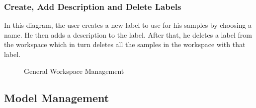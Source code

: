 \subsubsection{Create, Add Description and Delete Labels}
In this diagram, the user creates a new label to use for his samples by choosing a name. He then adds a description to the label. After that, he deletes a label from the workspace which in turn deletes all the samples in the workspace with that label.
\begin{figure}[!htb]
    \centering
    \caption{General Workspace Management}
    \label{fig:seq-workspace-management}
\end{figure}

\subsection{Model Management}

